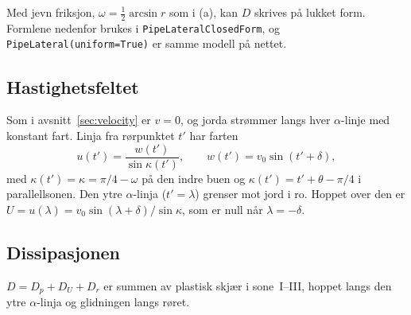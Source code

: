 \documentclass[11pt,a4paper]{article}
\begin{document}
Med jevn friksjon, $\omega = \tfrac12\arcsin r$ som i (a), kan $D$ skrives
på lukket form.  Formlene nedenfor brukes i
\texttt{PipeLateralClosedForm}, og \texttt{PipeLateral(uniform=True)} er
samme modell på nettet.

\subsection*{Hastighetsfeltet}

Som i avsnitt~\ref{sec:velocity} er $v = 0$, og jorda strømmer langs hver
$\alpha$-linje med konstant fart.  Linja fra rørpunktet $t'$ har farten
\begin{equation}
  u(t') = \frac{w(t')}{\sin\kappa(t')} , \qquad
  w(t') = v_0\sin(t' + \delta) ,
\end{equation}
med $\kappa(t') = \kappa = \pi/4 - \omega$ på den indre buen og
$\kappa(t') = t' + \theta - \pi/4$ i parallellsonen.  Den ytre
$\alpha$-linja ($t' = \lambda$) grenser mot jord i ro.  Hoppet over den er
$U = u(\lambda) = v_0\sin(\lambda + \delta)/\sin\kappa$, som er null når
$\lambda = -\delta$.

\subsection*{Dissipasjonen}

$D = D_p + D_U + D_r$ er summen av plastisk skjær i sone~I--III, hoppet
langs den ytre $\alpha$-linja og glidningen langs røret.
\end{document}

